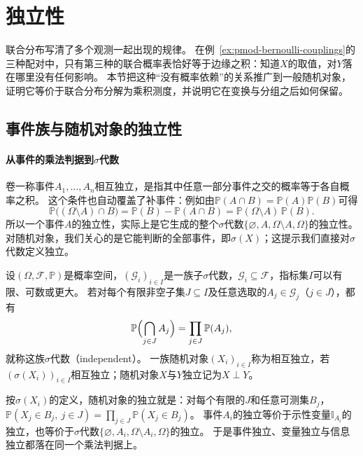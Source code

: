 \section{独立性}
\label{sec:pmod-independence}

联合分布写清了多个观测一起出现的规律。
在例~\ref{ex:pmod-bernoulli-couplings}的三种配对中，只有第三种的联合概率表恰好等于边缘之积：知道$X$的取值，对$Y$落在哪里没有任何影响。
本节把这种“没有概率依赖”的关系推广到一般随机对象，证明它等价于联合分布分解为乘积测度，并说明它在变换与分组之后如何保留。

\subsection{事件族与随机对象的独立性}

\paragraph{从事件的乘法判据到$\sigma$代数}
卷一称事件$A_1,\dots,A_n$相互独立，是指其中任意一部分事件之交的概率等于各自概率之积。
这个条件也自动覆盖了补事件：例如由$\mathbb P(A\cap B)=\mathbb P(A)\mathbb P(B)$可得
\[
  \mathbb P\bigl((\Omega\setminus A)\cap B\bigr)=\mathbb P(B)-\mathbb P(A\cap B)=\mathbb P(\Omega\setminus A)\,\mathbb P(B).
\]
所以一个事件$A$的独立性，实际上是它生成的整个$\sigma$代数$\{\varnothing,A,\Omega\setminus A,\Omega\}$的独立性。
对随机对象，我们关心的是它能判断的全部事件，即$\sigma(X)$；这提示我们直接对$\sigma$代数定义独立。

\begin{definition}
\label{def:pmod-independence}
设$(\Omega,\mathcal F,\mathbb P)$是概率空间，$(\mathcal G_i)_{i\in I}$是一族子$\sigma$代数，$\mathcal G_i\subseteq\mathcal F$，指标集$I$可以有限、可数或更大。
若对每个有限非空子集$J\subseteq I$及任意选取的$A_j\in\mathcal G_j$（$j\in J$），都有
\[
  \mathbb P\Bigl(\bigcap_{j\in J}A_j\Bigr)=\prod_{j\in J}\mathbb P(A_j),
\]
就称这族$\sigma$代数（independent）。
一族随机对象$(X_i)_{i\in I}$称为相互独立，若$(\sigma(X_i))_{i\in I}$相互独立；随机对象$X$与$Y$独立记为$X\perp Y$。
\end{definition}

按$\sigma(X_i)$的定义，随机对象的独立就是：对每个有限的$J$和任意可测集$B_j$，
$\mathbb P(X_j\in B_j,\ j\in J)=\prod_{j\in J}\mathbb P(X_j\in B_j)$。
事件$A_i$的独立等价于示性变量$\mathbb I_{A_i}$的独立，也等价于$\sigma$代数$\{\varnothing,A_i,\Omega\setminus A_i,\Omega\}$的独立。
于是事件独立、变量独立与信息独立都落在同一个乘法判据上。

